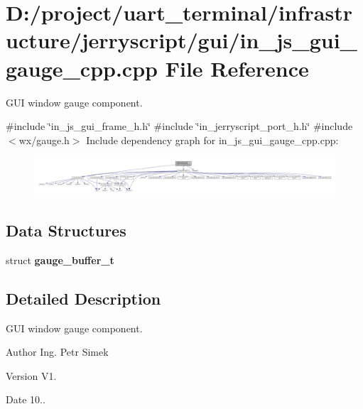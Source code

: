 \section{D\+:/project/uart\+\_\+terminal/infrastructure/jerryscript/gui/in\+\_\+js\+\_\+gui\+\_\+gauge\+\_\+cpp.cpp File Reference}
\label{in__js__gui__gauge__cpp_8cpp}


G\+UI window gauge component.  


{\ttfamily \#include \char`\"{}in\+\_\+js\+\_\+gui\+\_\+frame\+\_\+h.\+h\char`\"{}}\newline
{\ttfamily \#include \char`\"{}in\+\_\+jerryscript\+\_\+port\+\_\+h.\+h\char`\"{}}\newline
{\ttfamily \#include $<$wx/gauge.\+h$>$}\newline
Include dependency graph for in\+\_\+js\+\_\+gui\+\_\+gauge\+\_\+cpp.\+cpp\+:
\nopagebreak
\begin{figure}[H]
\begin{center}
\leavevmode
\includegraphics[width=350pt]{in__js__gui__gauge__cpp_8cpp__incl}
\end{center}
\end{figure}
\subsection*{Data Structures}
\begin{DoxyCompactItemize}
\item 
struct \textbf{ gauge\+\_\+buffer\+\_\+t}
\end{DoxyCompactItemize}


\subsection{Detailed Description}
G\+UI window gauge component. 

\begin{DoxyAuthor}{Author}
Ing. Petr Simek 
\end{DoxyAuthor}
\begin{DoxyVersion}{Version}
V1. 
\end{DoxyVersion}
\begin{DoxyDate}{Date}
10.. 
\end{DoxyDate}
